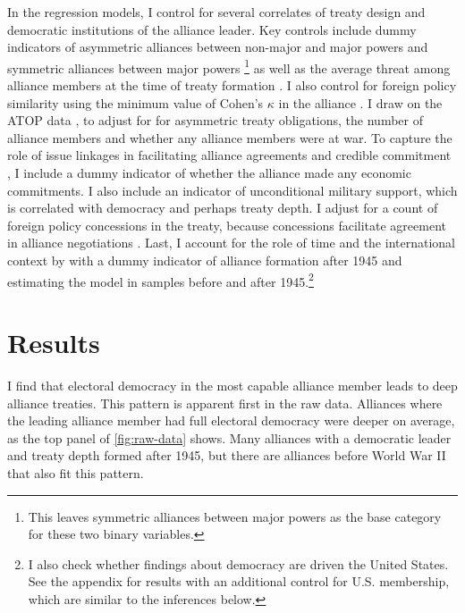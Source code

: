 \documentclass[12pt]{article}
\begin{document}
In the regression models, I control for several correlates of treaty design and democratic institutions of the alliance leader. 
Key controls include dummy indicators of asymmetric alliances between non-major and major powers and symmetric alliances between major powers \citep{Mattes2012}\footnote{This leaves symmetric alliances between major powers as the base category for these two binary variables.} as well as the average threat among alliance members at the time of treaty formation \citep{LeedsSavun2007}. 
I also control for foreign policy similarity using the minimum value of Cohen's $\kappa$ in the alliance \citep{Hage2011}.
I draw on the ATOP data \citep{Leedsetal2002}, to adjust for for asymmetric treaty obligations, the number of alliance members and whether any alliance members were at war. 
To capture the role of issue linkages in facilitating alliance agreements and credible commitment \citep{Poast2012, Poast2013}, I include a dummy indicator of whether the alliance made any economic commitments. 
I also include an indicator of unconditional military support, which is correlated with democracy \citep{Chibaetal2015} and perhaps treaty depth. 
I adjust for a count of foreign policy concessions in the treaty, because concessions facilitate agreement in alliance negotiations \citep{Johnson2015}. 
Last, I account for the role of time and the international context by with a dummy indicator of alliance formation after 1945 and estimating the model in samples before and after 1945.\footnote{I also check whether findings about democracy are driven the United States. See the appendix for results with an additional control for U.S. membership, which are similar to the inferences below.}



\section{Results}


I find that electoral democracy in the most capable alliance member leads to deep alliance treaties. 
This pattern is apparent first in the raw data. 
Alliances where the leading alliance member had full electoral democracy were deeper on average, as the top panel of \autoref{fig:raw-data} shows. 
Many alliances with a democratic leader and treaty depth formed after 1945, but there are alliances before World War II that also fit this pattern. 
\end{document}
